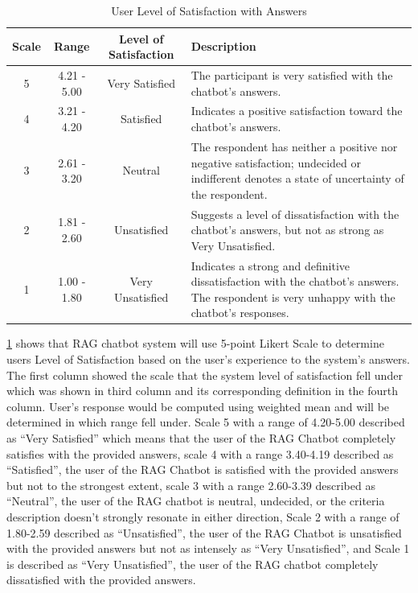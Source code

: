 \begin{refsection}
\begin{table}[H] %
    \centering
    \caption{User Level of Satisfaction with Answers}
    \label{tab:satisfaction_scale}
    \footnotesize
    \begin{tabular}{cccp{7cm}}       \hline
        \textbf{Scale} & \textbf{Range} & \textbf{Level of Satisfaction} & \textbf{Description} \\
        \hline
        5 & 4.21 - 5.00 & Very Satisfied & The participant is very satisfied with the chatbot's answers.\\
        \hline
        4 & 3.21 - 4.20 & Satisfied & Indicates a positive satisfaction toward the chatbot's answers. \\
        \hline
        3 & 2.61 - 3.20 & Neutral & The respondent has neither a positive nor negative satisfaction; undecided or indifferent denotes a state of uncertainty of the respondent. \\
        \hline
        2 & 1.81 - 2.60 & Unsatisfied & Suggests a level of dissatisfaction with the chatbot's answers, but not as strong as Very Unsatisfied.\\
        \hline
        1 & 1.00 - 1.80 & Very Unsatisfied & Indicates a strong and definitive dissatisfaction with the chatbot's answers. The respondent is very unhappy with the chatbot's responses.\\
        \hline
    \end{tabular}
\end{table}

\ref{tab:satisfaction_scale} shows that RAG chatbot system will use 5-point Likert Scale to determine users Level of Satisfaction based on the user’s experience to the system’s answers. The first column showed the scale that the system level of satisfaction fell under which was shown in third column and its corresponding definition in the fourth column. User’s response would be computed using weighted mean and will be determined in which range fell under. Scale 5 with a range of 4.20-5.00 described as “Very Satisfied” which means that the user of the RAG Chatbot completely satisfies with the provided answers, scale 4 with a range 3.40-4.19 described as “Satisfied”, the user of the RAG Chatbot is satisfied with the provided answers but not to the strongest extent, scale 3 with a range 2.60-3.39 described as “Neutral”, the user of the RAG chatbot is neutral, undecided, or the criteria description doesn’t strongly resonate in either direction, Scale 2 with a range of 1.80-2.59 described as “Unsatisfied”, the user of the RAG Chatbot is unsatisfied with the provided answers but not as intensely as “Very Unsatisfied”, and Scale 1 is described as “Very Unsatisfied”, the user of the RAG chatbot completely dissatisfied with the provided answers.


\end{refsection}
